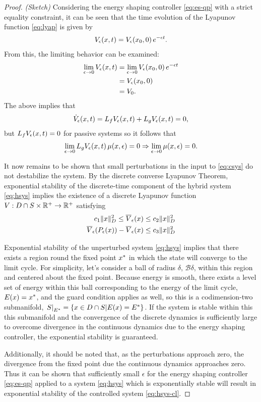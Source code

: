 \begin{proof}
  {\em (Sketch)} Considering the energy shaping controller \eqref{eq:es-qp} with a strict equality constraint, it can be seen that the time evolution of the Lyapunov function \eqref{eq:lyap} is given by
  \begin{align*}
    V_{\epsilon}(x, t) = V_{\epsilon}(x_{0}, 0) \, e^{-\epsilon t}.
  \end{align*}
  From this, the limiting behavior can be examined:
  \begin{align*}
    \lim_{\epsilon \to 0} V_{\epsilon}(x, t) &= \lim_{\epsilon \to 0} V_{\epsilon}(x_{0}, 0) \, e^{-\epsilon t}\\
    &= V_{\epsilon}(x_{0}, 0)\\
    &= V_0.
  \end{align*}
  The above implies that
  \begin{align*}
    {\dot V}_{\epsilon}(x, t) = L_{f} V_{\epsilon}(x, t) + L_{g} V_{\epsilon}(x, t) = 0,
  \end{align*}
  but $L_{f} V_{\epsilon}(x, t) = 0$ for passive systems so it follows that
  \begin{align*}
    \lim_{\epsilon \to 0} L_{g} V_{\epsilon}(x, t) \, \mu(x, \epsilon) = 0 \Rightarrow \lim_{\epsilon \to 0} \mu(x, \epsilon) = 0.
  \end{align*}

  It now remains to be shown that small perturbations in the input to \eqref{eq:csys} do not destabilize the system.
  By the discrete converse Lyapunov Theorem, exponential stability of the discrete-time component of the hybrid system \eqref{eq:hsys} implies the existence of a discrete Lyapunov function $V : D \cap S \times \mathbb{R}^{+} \to \mathbb{R}^{+}$ satisfying
  \begin{align*}
    c_{1} \| x \|^{2}_{D} \leq \overline{V}_{\epsilon}(x) \leq c_{2} \| x \|_{D}^2\\
    \overline{V}_{\epsilon}(P_{\epsilon}(x)) - \overline{V}_{\epsilon}(x) \leq c_{3} \| x \|^{2}_{D}
  \end{align*}

  Exponential stability of the unperturbed system \eqref{eq:hsys} implies that there exists a region round the fixed point $x^{*}$ in which the state will converge to the limit cycle.
  For simplicity, let's consider a ball of radius $\delta$, $\mathcal{B}\delta$, within this region and centered about the fixed point.
  Because energy is smooth, there exists a level set of energy within this ball corresponding to the energy of the limit cycle, $E(x) = x^{*}$, and the guard condition applies as well, so this is a codimension-two submanifold, $\left.S\right|_{E^{*}} = \{ x \in D \cap S | E(x) = E^{*} \}$.
  If the system is stable within this this submanifold and the convergence of the discrete dynamics is sufficiently large to overcome divergence in the continuous dynamics due to the energy shaping controller, the exponential stability is guaranteed.


  Additionally, it should be noted that, as the perturbations approach zero, the divergence from the fixed point due the continuous dynamics approaches zero.
  Thus it can be shown that sufficiently small $\epsilon$ for the energy shaping controller \eqref{eq:es-qp} applied to a system \eqref{eq:hsys} which is exponentially stable will result in exponential stability of the controlled system \eqref{eq:hsys-cl}.
\end{proof}

